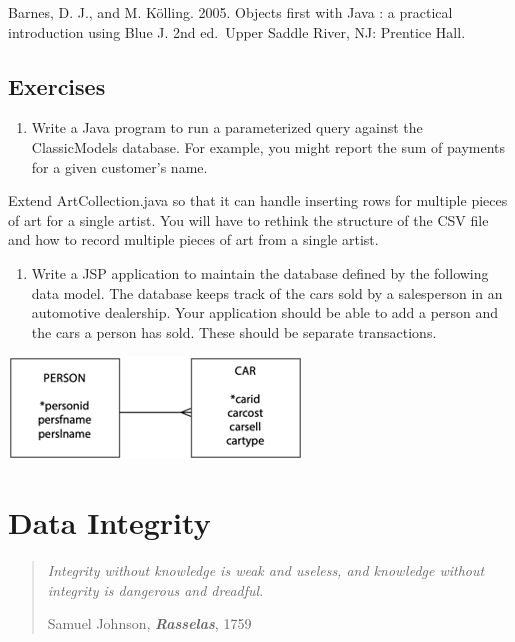 \documentclass[
]{article}
\providecommand{\tightlist}{%
  \setlength{\itemsep}{0pt}\setlength{\parskip}{0pt}}
\begin{document}
Barnes, D. J., and M. Kölling. 2005. Objects first with Java : a
practical introduction using Blue J. 2nd ed.~Upper Saddle River, NJ:
Prentice Hall.

\hypertarget{exercises-13}{%
\subsection*{Exercises}\label{exercises-13}}

\begin{enumerate}
\def\labelenumi{\arabic{enumi}.}
\tightlist
\item
  Write a Java program to run a parameterized query against the
  ClassicModels database. For example, you might report the sum of
  payments for a given customer's name.
\end{enumerate}

Extend ArtCollection.java so that it can handle inserting rows for
multiple pieces of art for a single artist. You will have to rethink the
structure of the CSV file and how to record multiple pieces of art from
a single artist.

\begin{enumerate}
\def\labelenumi{\arabic{enumi}.}
\setcounter{enumi}{1}
\tightlist
\item
  Write a JSP application to maintain the database defined by the
  following data model. The database keeps track of the cars sold by a
  salesperson in an automotive dealership. Your application should be
  able to add a person and the cars a person has sold. These should be
  separate transactions.
\end{enumerate}

\includegraphics{Figures/Chapter 22/person-car.png}

\hypertarget{data-integrity}{%
\section{Data Integrity}\label{data-integrity}}

\begin{quote}
\emph{Integrity without knowledge is weak and useless, and knowledge
without integrity is dangerous and dreadful.}

Samuel Johnson, \textbf{\emph{Rasselas}}, 1759
\end{quote}
\end{document}
